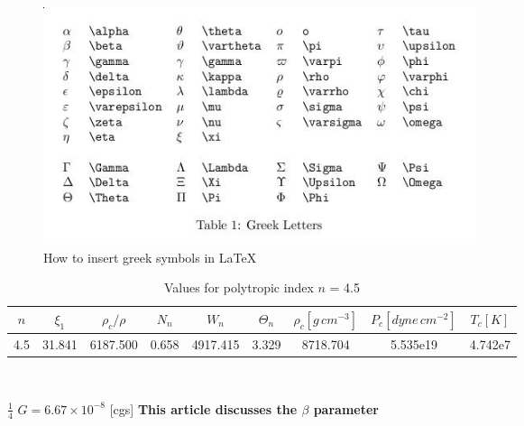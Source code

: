 \documentclass[12pt]{article}
\begin{document}

\begin{figure}[h]   %
\centering
\includegraphics[width=5.0in]{GreekSymbols.jpg}
\caption{How to insert greek symbols in LaTeX}
\label{greek}
\end{figure}



\begin{table}[h]
\caption{Values for polytropic index $n$ = 4.5}
\centering
\begin{tabular}{ c c c c c c c c c  }
 \hline\hline
$n$ & $\xi_1$ & $\rho_c/\rho$ & $N_{n}$ & $W_n$ & $\Theta_n$
& $\rho_c[g\,cm^{-3}]$ & $P_c[dyne\,cm^{-2}]$ & $T_c[K]$ \\
\hline
4.5 & 31.841 & 6187.500 & 0.658 & 4917.415 & 3.329 & 8718.704 &
5.535e19 & 4.742e7 \\
\hline
\end{tabular}\\
\label{table:nonlin}
\end{table}


$\frac{1}{4}$   %
$G = 6.67\times10^{-8}$ [cgs] %
\textbf{This article discusses the \boldmath$\beta$ parameter}
\end{document}
